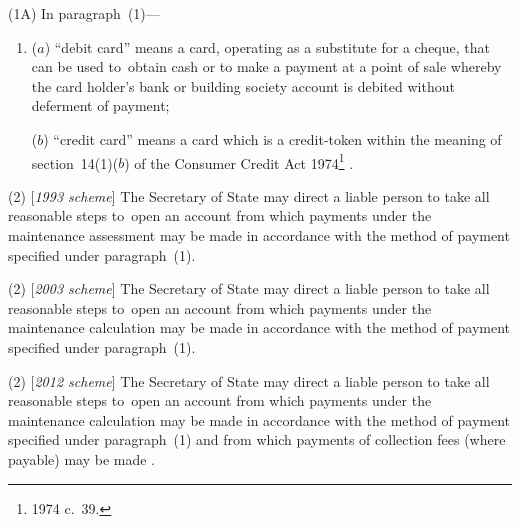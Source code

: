 \documentclass[12pt,a4paper]{article}
\begin{document}

(1A) In paragraph~(1)—
\begin{enumerate}\item[]
($a$) “debit card” means a card, operating as a substitute for a cheque, that can be used to~obtain cash or to make a payment at a point of sale whereby the card holder’s bank or building society account is debited without deferment of payment;

($b$) “credit card” means a card which is a credit-token within the meaning of section~14(1)($b$)  of the Consumer Credit Act 1974\footnote{1974 c.~39.}%
%
.
\end{enumerate}

(2) [\emph{1993 scheme}] The Secretary of State may direct a liable person to take all reasonable steps to~open an account from which payments under the maintenance assessment may be made in accordance with the method of payment specified under paragraph~(1).

(2) [\emph{2003 scheme}] The Secretary of State may direct a liable person to take all reasonable steps to~open an account from which payments under the maintenance 
calculation  %
may be made in accordance with the method of payment specified under paragraph~(1).

(2) [\emph{2012 scheme}] The Secretary of State may direct a liable person to take all reasonable steps to~open an account from which payments under the maintenance 
calculation  %
may be made in accordance with the method of payment specified under paragraph~(1)
and from which payments of collection fees (where payable) may be made%
.
\end{document}

